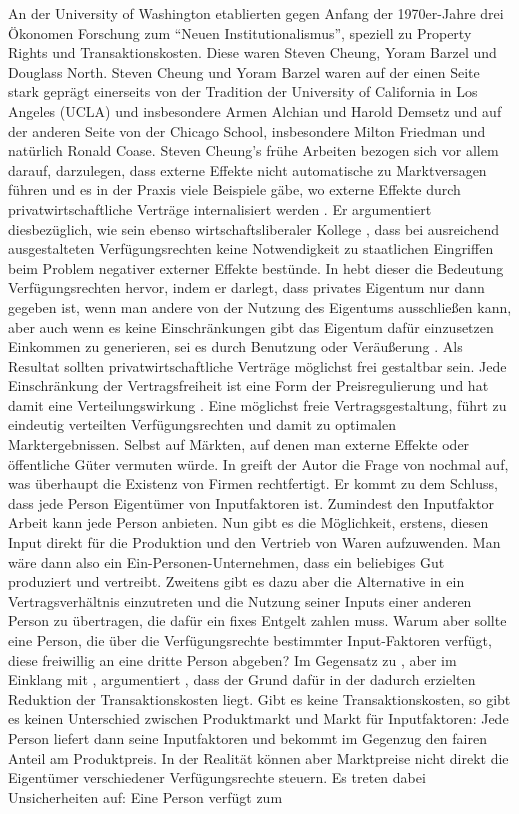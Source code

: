 An der University of Washington etablierten gegen Anfang der 1970er-Jahre drei Ökonomen Forschung zum "`Neuen Institutionalismus"', speziell zu Property Rights und Transaktionskosten. Diese waren Steven Cheung, Yoram Barzel und Douglass North. Steven Cheung und Yoram Barzel waren auf der einen Seite stark geprägt einerseits von der Tradition der University of California in Los Angeles (UCLA) und insbesondere Armen Alchian und Harold Demsetz und auf der anderen Seite von der Chicago School, insbesondere Milton Friedman und natürlich Ronald Coase. Steven Cheung's frühe Arbeiten bezogen sich vor allem darauf, darzulegen, dass externe Effekte nicht automatische zu Marktversagen führen und es in der Praxis viele Beispiele gäbe, wo externe Effekte durch privatwirtschaftliche Verträge internalisiert werden \parencite{Cheung1973}. Er argumentiert diesbezüglich, wie sein ebenso wirtschaftsliberaler Kollege \textcite{Demsetz2011}, dass bei ausreichend ausgestalteten Verfügungsrechten keine Notwendigkeit zu staatlichen Eingriffen beim Problem negativer externer Effekte bestünde. In \textcite{Cheung1974} hebt dieser die Bedeutung Verfügungsrechten hervor, indem er darlegt, dass privates Eigentum nur dann gegeben ist, wenn man andere von der Nutzung des Eigentums ausschließen kann, aber auch wenn es keine Einschränkungen gibt das Eigentum dafür einzusetzen Einkommen zu generieren, sei es durch Benutzung oder Veräußerung \parencite[S. 56f]{Cheung1974}. Als Resultat sollten privatwirtschaftliche Verträge möglichst frei gestaltbar sein. Jede Einschränkung der Vertragsfreiheit ist eine Form der Preisregulierung und hat damit eine Verteilungswirkung \parencite[S. 66]{Cheung1974}. Eine möglichst freie Vertragsgestaltung, führt zu eindeutig verteilten Verfügungsrechten und damit zu optimalen Marktergebnissen. Selbst auf Märkten, auf denen man externe Effekte oder öffentliche Güter vermuten würde. In \textcite{Cheung1983} greift der Autor die Frage von \textcite{Coase1937} nochmal auf, was überhaupt die Existenz von Firmen rechtfertigt. Er kommt zu dem Schluss, dass jede Person Eigentümer von Inputfaktoren ist. Zumindest den Inputfaktor Arbeit kann jede Person anbieten. Nun gibt es die Möglichkeit, erstens, diesen Input direkt für die Produktion und den Vertrieb von Waren aufzuwenden. Man wäre dann also ein Ein-Personen-Unternehmen, dass ein beliebiges Gut produziert und vertreibt. Zweitens gibt es dazu aber die Alternative in ein Vertragsverhältnis einzutreten und die Nutzung seiner Inputs einer anderen Person zu übertragen, die dafür ein fixes Entgelt zahlen muss. Warum aber sollte eine Person, die über die Verfügungsrechte bestimmter Input-Faktoren verfügt, diese freiwillig an eine dritte Person abgeben? Im Gegensatz zu \textcite{Alchian1972}, aber im Einklang mit \textcite{Coase1937}, argumentiert \textcite[S. 3f]{Cheung1983}, dass der Grund dafür in der dadurch erzielten Reduktion der Transaktionskosten liegt. Gibt es keine Transaktionskosten, so gibt es keinen Unterschied zwischen Produktmarkt und Markt für Inputfaktoren: Jede Person liefert dann seine Inputfaktoren und bekommt im Gegenzug den fairen Anteil am Produktpreis. In der Realität können aber Marktpreise nicht direkt die Eigentümer verschiedener Verfügungsrechte steuern. Es treten dabei Unsicherheiten auf: Eine Person verfügt zum 
